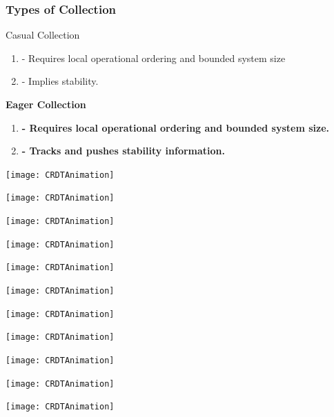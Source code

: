 \documentclass{beamer}
\begin{document}
    \begin{frame}
        \frametitle{Types of Collection}
        Casual Collection
        \begin{enumerate}
            \item - Requires local operational ordering and bounded
                system size
            \item - Implies stability.
        \end{enumerate}

        \textbf{Eager Collection}
        \begin{enumerate}
            \item \textbf{- Requires local operational ordering and bounded
                system size.}
            \item \textbf{- Tracks and pushes stability information.}
        \end{enumerate}
    \end{frame}

    \begin{frame}
        \texttt{[image: CRDTAnimation]}
    \end{frame}
    \begin{frame}
        \texttt{[image: CRDTAnimation]}
    \end{frame}
    \begin{frame}
        \texttt{[image: CRDTAnimation]}
    \end{frame}
    \begin{frame}
        \texttt{[image: CRDTAnimation]}
    \end{frame}
    \begin{frame}
        \texttt{[image: CRDTAnimation]}
    \end{frame}
    \begin{frame}
        \texttt{[image: CRDTAnimation]}
    \end{frame}
    \begin{frame}
        \texttt{[image: CRDTAnimation]}
    \end{frame}
    \begin{frame}
        \texttt{[image: CRDTAnimation]}
    \end{frame}
    \begin{frame}
        \texttt{[image: CRDTAnimation]}
    \end{frame}
    \begin{frame}
        \texttt{[image: CRDTAnimation]}
    \end{frame}
    \begin{frame}
        \texttt{[image: CRDTAnimation]}
    \end{frame}
\end{document}
